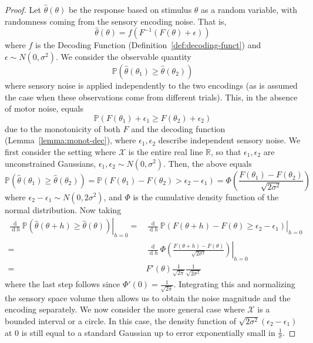 \begin{proof}
    Let $\widehat{\theta}(\theta)$ be the response based on stimulus $\theta$ as a random variable, with randomness coming from the sensory encoding noise.
    That is,
    \begin{equation}
        \widehat{\theta}(\theta) = f(F^{-1}(F(\theta) + \epsilon))
    \end{equation}
    where $f$ is the Decoding Function (Definition~\ref{def:decoding-funct}) and $\epsilon \sim N(0,\sigma^2)$.
    We consider the observable quantity
\begin{equation}
\mathbb{P}\left(\widehat{\theta}(\theta_1) \geq \widehat{\theta}(\theta_2)\right)
\end{equation}
where sensory noise is applied independently to the two encodings (as is assumed the case when these observations come from different trials).
This, in the absence of motor noise, equals
\begin{equation}
\mathbb{P}\left(F(\theta_1) + \epsilon_1 \geq F(\theta_2) + \epsilon_2\right)
\end{equation}
due to the monotonicity of both $F$ and the decoding function (Lemma~\ref{lemma:monot-dec}), where $\epsilon_1, \epsilon_2$ describe independent sensory noise.
We first consider the setting where $\mathcal{X}$ is the entire real line $\mathbb{R}$, so that $\epsilon_1, \epsilon_2$ are unconstrained Gaussians, $\epsilon_1, \epsilon_2 \sim N(0,\sigma^2)$.
Then, the above equals
\begin{equation}\label{eq:comparison-encodings-cumulative}
\mathbb{P}\left(\widehat{\theta}(\theta_1) \geq \widehat{\theta}(\theta_2)\right) = \mathbb{P}\left(F(\theta_1) - F(\theta_2) > \epsilon_2-\epsilon_1\right) = \Phi\left(\frac{F(\theta_1) - F(\theta_2)}{\sqrt{2\sigma^2}}\right)
\end{equation}
where $\epsilon_2-\epsilon_1 \sim N(0,2\sigma^2)$, and $\Phi$ is the cumulative density function of the normal distribution. 
Now taking
\begin{align*}
 \left.\frac{\operatorname{d}}{\operatorname{d}h}  \mathbb{P}(\widehat{\theta}(\theta+h) \geq \widehat{\theta}(\theta))\right|_{h=0}
= & \left.\frac{\operatorname{d}}{\operatorname{d}h}  \mathbb{P}(F(\theta+h) - F(\theta) \geq \epsilon_2-\epsilon_1)\right|_{h=0} \\
    =&  \left.\frac{\operatorname{d}}{\operatorname{d}h}  \Phi\left(\frac{F(\theta+h) - F(\theta)}{\sqrt{2\sigma^2}}\right)\right|_{h=0} \\
    = & F'(\theta) \frac{1}{\sqrt{2\pi}} \frac{1}{\sqrt{2\sigma^2}}
\end{align*}
where the last step follows since $\Phi'(0) = \frac{1}{\sqrt{2\pi}}$.
Integrating this and normalizing the sensory space volume then allows us to obtain the noise magnitude and the encoding separately.
We now consider the more general case where $\mathcal{X}$ is a bounded interval or a circle. In this case, the density function of $\sqrt{2\sigma^2}\left(\epsilon_2-\epsilon_1\right)$ at 0 is still equal to a standard Gaussian up to error exponentially small in $\frac{1}{\sigma}$.
\end{proof}


